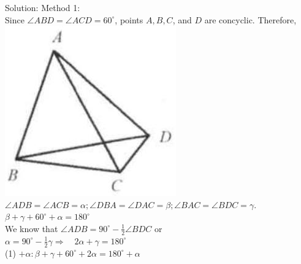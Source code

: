 \documentclass[10pt]{article}
\begin{document}
Solution:
Method 1:\\
Since \(\angle A B D=\angle A C D=60^{\circ}\), points \(A, B, C\), and \(D\) are concyclic. Therefore,\\
\includegraphics[max width=\textwidth, center]{2025_04_17_97bc1f7e44d93c271a88g-196(2)}\\
\(\angle A D B=\angle A C B=\alpha ; \angle D B A=\angle D A C=\beta ; \angle B A C=\angle B D C=\gamma\).\\
\(\beta+\gamma+60^{\circ}+\alpha=180^{\circ}\)\\
We know that \(\angle A D B=90^{\circ}-\frac{1}{2} \angle B D C\) or\\
\(\alpha=90^{\circ}-\frac{1}{2} \gamma \Rightarrow \quad 2 \alpha+\gamma=180^{\circ}\)\\
(1) \(+\alpha: \beta+\gamma+60^{\circ}+2 \alpha=180^{\circ}+\alpha\)\\
\end{document}
